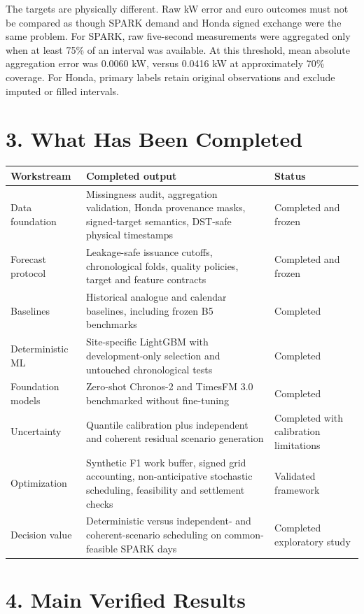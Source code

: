 \documentclass[10pt,a4paper]{article}
\begin{document}
The targets are physically different. Raw kW error and euro outcomes must not
be compared as though SPARK demand and Honda signed exchange were the same
problem. For SPARK, raw five-second measurements were aggregated only when at
least 75\% of an interval was available. At this threshold, mean absolute
aggregation error was 0.0060 kW, versus 0.0416 kW at approximately 70\%
coverage. For Honda, primary labels retain original observations and exclude
imputed or filled intervals.

\section*{3. What Has Been Completed}

\begin{tabularx}{\textwidth}{p{}X p{}}
\toprule
Workstream & Completed output & Status\\
\midrule
Data foundation & Missingness audit, aggregation validation, Honda provenance
masks, signed-target semantics, DST-safe physical timestamps & Completed and
frozen\\
Forecast protocol & Leakage-safe issuance cutoffs, chronological folds,
quality policies, target and feature contracts & Completed and frozen\\
Baselines & Historical analogue and calendar baselines, including frozen B5
benchmarks & Completed\\
Deterministic ML & Site-specific LightGBM with development-only selection and
untouched chronological tests & Completed\\
Foundation models & Zero-shot Chronos-2 and TimesFM 3.0 benchmarked without
fine-tuning & Completed\\
Uncertainty & Quantile calibration plus independent and coherent residual
scenario generation & Completed with calibration limitations\\
Optimization & Synthetic F1 work buffer, signed grid accounting,
non-anticipative stochastic scheduling, feasibility and settlement checks &
Validated framework\\
Decision value & Deterministic versus independent- and coherent-scenario
scheduling on common-feasible SPARK days & Completed exploratory study\\
\bottomrule
\end{tabularx}

\newpage
\section*{4. Main Verified Results}
\end{document}
